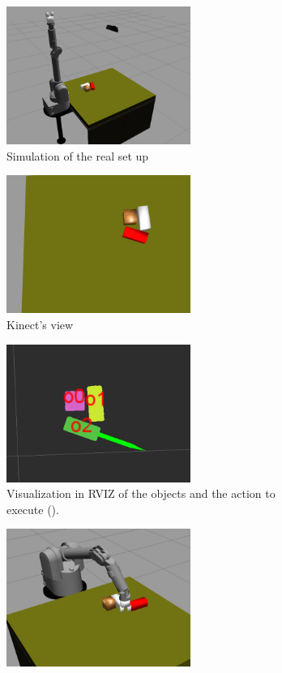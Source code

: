 \begin{figure}
\centering
\begin{subfigure}[h]{0.45\textwidth}
\centering
\includegraphics[width=6cm]{Img/simulation/setup_sim.png}
\caption{Simulation of the real set up}\label{fig:sim_setup}
\end{subfigure}
\begin{subfigure}[h]{0.45\textwidth}
\centering
\includegraphics[width=6cm]{Img/simulation/image.png}
\caption{Kinect's view}
\label{fig:sim_kinect}
\end{subfigure}
\begin{subfigure}[h]{0.45\textwidth}
\centering
\includegraphics[width=6cm]{Img/simulation/action1.png}
\caption{Visualization in RVIZ of the objects and the action to execute ().}
\label{fig:sim_rviz}
\end{subfigure}
\begin{subfigure}[h]{0.45\textwidth}
\centering
\includegraphics[width=6cm]{Img/simulation/pushing.png}

\end{subfigure}
\end{figure}
